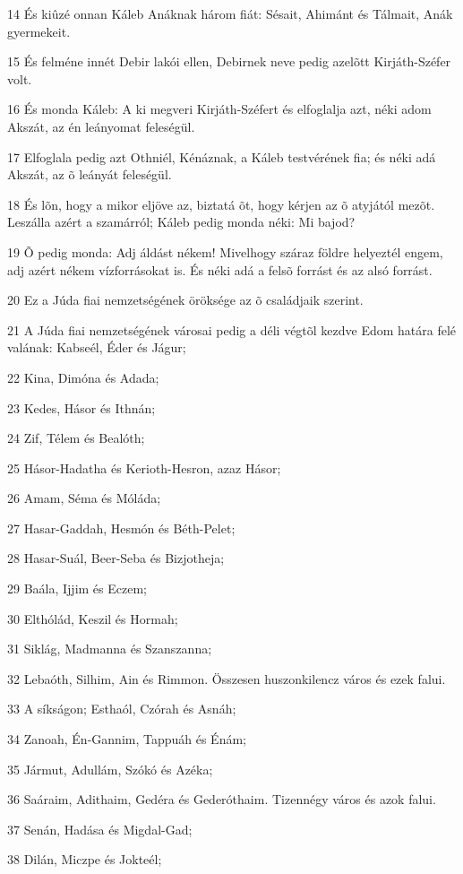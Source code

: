 \par 14 És kiûzé onnan Káleb Anáknak három fiát: Sésait, Ahimánt és Tálmait, Anák gyermekeit.
\par 15 És felméne innét Debir lakói ellen, Debirnek neve pedig azelõtt Kirjáth-Széfer volt.
\par 16 És monda Káleb: A ki megveri Kirjáth-Széfert és elfoglalja azt, néki adom Akszát, az én leányomat feleségül.
\par 17 Elfoglala pedig azt Othniél, Kénáznak, a Káleb testvérének fia; és néki adá Akszát, az õ leányát feleségül.
\par 18 És lõn, hogy a mikor eljöve az, biztatá õt, hogy kérjen az õ atyjától mezõt. Leszálla azért a szamárról; Káleb pedig monda néki: Mi bajod?
\par 19 Õ pedig monda: Adj áldást nékem! Mivelhogy száraz földre helyeztél engem, adj azért nékem vízforrásokat is. És néki adá a felsõ forrást és az alsó forrást.
\par 20 Ez a Júda fiai nemzetségének öröksége az õ családjaik szerint.
\par 21 A Júda fiai nemzetségének városai pedig a déli végtõl kezdve Edom határa felé valának: Kabseél, Éder és Jágur;
\par 22 Kina, Dimóna és Adada;
\par 23 Kedes, Hásor és Ithnán;
\par 24 Zif, Télem és Bealóth;
\par 25 Hásor-Hadatha és Kerioth-Hesron, azaz Hásor;
\par 26 Amam, Séma és Móláda;
\par 27 Hasar-Gaddah, Hesmón és Béth-Pelet;
\par 28 Hasar-Suál, Beer-Seba és Bizjotheja;
\par 29 Baála, Ijjim és Eczem;
\par 30 Elthólád, Keszil és Hormah;
\par 31 Siklág, Madmanna és Szanszanna;
\par 32 Lebaóth, Silhim, Ain és Rimmon. Összesen huszonkilencz város és ezek falui.
\par 33 A síkságon; Esthaól, Czórah és Asnáh;
\par 34 Zanoah, Én-Gannim, Tappuáh és Énám;
\par 35 Jármut, Adullám, Szókó és Azéka;
\par 36 Saáraim, Adithaim, Gedéra és Gederóthaim. Tizennégy város és azok falui.
\par 37 Senán, Hadása és Migdal-Gad;
\par 38 Dilán, Miczpe és Jokteél;
